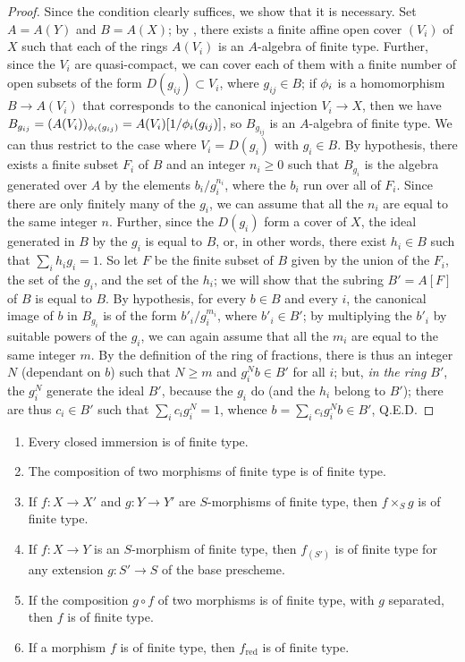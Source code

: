 \begin{proof}
\label{proof-1.6.3.3}
Since the condition clearly suffices, we show that it is necessary.
Set $A=A(Y)$ and $B=A(X)$;
by , there exists a finite affine open cover $(V_i)$ of $X$ such that each of the rings $A(V_i)$ is an $A$-algebra of finite type.
Further, since the $V_i$ are quasi-compact, we can cover each of them with a finite number of open subsets of the form $D(g_{ij})\subset V_i$, where $g_{ij}\in B$;
if $\phi_i$ is a homomorphism $B\to A(V_i)$ that corresponds to the canonical injection $V_i\to X$, then we have $B_{g_{ij}}=(A(V_i))_{\phi_i(g_{ij})}=A(V_i)[1/\phi_i(g_{ij})]$, so $B_{g_{ij}}$ is an $A$-algebra of finite type.
We can thus restrict to the case where $V_i=D(g_i)$ with $g_i\in B$.
By hypothesis, there exists a finite subset $F_i$ of $B$ and an integer $n_i\geqslant0$ such that $B_{g_i}$ is the algebra generated over $A$ by the elements $b_i/g_i^{n_i}$, where the $b_i$ run over all of $F_i$.
Since there are only finitely many of the $g_i$, we can assume that all the $n_i$ are equal to the same integer $n$.
Further, since the $D(g_i)$ form a cover of $X$, the ideal generated in $B$ by the $g_i$ is equal to $B$, or, in other words, there exist $h_i\in B$ such that $\sum_i h_ig_i=1$.
So let $F$ be the finite subset of $B$ given by the union of the $F_i$, the set of the $g_i$, and the set of the $h_i$; we will show that the subring $B'=A[F]$ of $B$ is equal to $B$.
By hypothesis, for every $b\in B$ and every $i$, the canonical image of $b$ in $B_{g_i}$ is of the form $b'_i/g_i^{m_i}$, where $b'_i\in B'$;
by multiplying the $b'_i$ by suitable powers of the $g_i$, we can again assume that all the $m_i$ are equal to the same integer $m$.
By the definition of the ring of fractions, there is thus an integer $N$ (dependant on $b$) such that $N\geqslant m$ and $g_i^Nb\in B'$ for all $i$;
but, \emph{in the ring $B'$}, the $g_i^N$ generate the ideal $B'$, because the $g_i$ do (and the $h_i$ belong to $B'$);
there are thus $c_i\in B'$ such that $\sum_i c_ig_i^N=1$, whence $b=\sum_ic_ig_i^Nb\in B'$, Q.E.D.
\end{proof}

\begin{prop}[6.3.4]
\label{1.6.3.4}
\begin{enumerate}[label=\emph{(\roman*)}]
    \item Every closed immersion is of finite type.
    \item The composition of two morphisms of finite type is of finite type.
    \item If $f:X\to X'$ and $g:Y\to Y'$ are $S$-morphisms of finite type, then $f\times_S g$ is of finite type.
    \item If $f:X\to Y$ is an $S$-morphism of finite type, then $f_{(S')}$ is of finite type for any extension $g:S'\to S$ of the base prescheme.
    \item If the composition $g\circ f$ of two morphisms is of finite type, with $g$ separated, then $f$ is of finite type.
    \item If a morphism $f$ is of finite type, then $f_\mathrm{red}$ is of finite type.
\end{enumerate}
\end{prop}

